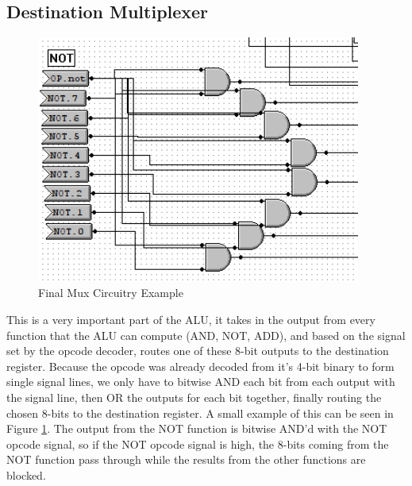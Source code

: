 \documentclass[a4paper,11pt]{article}
\begin{document}
\subsection{Destination Multiplexer}

   \begin{figure}
       \includegraphics[width=4.2in]{pictures/finalmux1}
     \caption{Final Mux Circuitry Example}
     \label{fig:finalmux1}
  \end{figure} 


This is a very important part of the ALU, it takes in the output from every function that the ALU can compute (AND, NOT, ADD), and based on the signal set by the opcode decoder, routes one of these 8-bit outputs to the destination register. Because the opcode was already decoded from it's 4-bit binary to form single signal lines, we only have to bitwise AND each bit from each output with the signal line, then OR the outputs for each bit together, finally routing the chosen 8-bits to the destination register. A small example of this can be seen in Figure \ref{fig:finalmux1}. The output from the NOT function is bitwise AND'd with the NOT opcode signal, so if the NOT opcode signal is high, the 8-bits coming from the NOT function pass through while the results from the other functions are blocked. 
\end{document}
